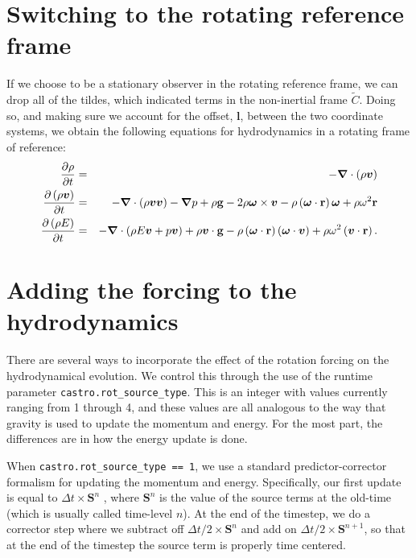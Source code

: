 \section{Switching to the rotating reference frame}
If we choose to be a stationary observer in the rotating reference
frame, we can drop all of the tildes, which indicated terms in the
non-inertial frame \(\widetilde{C}\).  Doing so, and making sure we
account for the offset, \(\boldsymbol{l}\), between the two coordinate systems, we obtain
the following equations for hydrodynamics in a rotating frame of
reference:
  \begin{eqnarray}
    \frac{\partial\rho}{\partial t} &=& -\boldsymbol{\nabla}\cdot\left(\rho\boldsymbol{v}\right) \label{eq:cont-rot-switch} \\
    \frac{\partial \left(\rho\boldsymbol{v}\right)}{\partial t} &=& -\boldsymbol{\nabla}\cdot\left(\rho\boldsymbol{v}\boldsymbol{v}\right) - \boldsymbol{\nabla} p + \rho{\bf g} - 2\rho\boldsymbol{\omega}\times\boldsymbol{v} - \rho\left(\boldsymbol{\omega}\cdot{\bf r}\right)\boldsymbol{\omega} + \rho\omega^2{\bf r} \label{eq:mom-rot-switch} \\
    \frac{\partial\left(\rho E\right)}{\partial t} &=& -\boldsymbol{\nabla}\cdot\left(\rho E\boldsymbol{v} + p\boldsymbol{v}\right) + \rho\boldsymbol{v}\cdot{\bf g} - \rho\left(\boldsymbol{\omega}\cdot{\bf r}\right)\left(\boldsymbol{\omega}\cdot\boldsymbol{v}\right) + \rho\omega^2\left(\boldsymbol{v}\cdot{\bf r}\right). \label{eq:etot-rot-switch}
  \end{eqnarray}

\section{Adding the forcing to the hydrodynamics}

There are several ways to incorporate the effect of the rotation forcing
on the hydrodynamical evolution. We control this through the use of the
runtime parameter {\tt castro.rot\_source\_type}. This is an integer
with values currently ranging from 1 through 4, and these values are all
analogous to the way that gravity is used to update the momentum and
energy. For the most part, the differences are in how the energy update is done.

When {\tt castro.rot\_source\_type == 1}, we use a standard predictor-corrector
formalism for updating the momentum and energy. Specifically, our first update
is equal to $\Delta t \times \mathbf{S}^n$ , where $\mathbf{S}^n$ is the value
of the source terms at the old-time (which is usually called time-level $n$).
At the end of the timestep, we do a corrector step where we subtract off
$\Delta t / 2 \times \mathbf{S}^n$ and add on $\Delta t / 2 \times \mathbf{S}^{n+1}$,
so that at the end of the timestep the source term is properly time centered.

